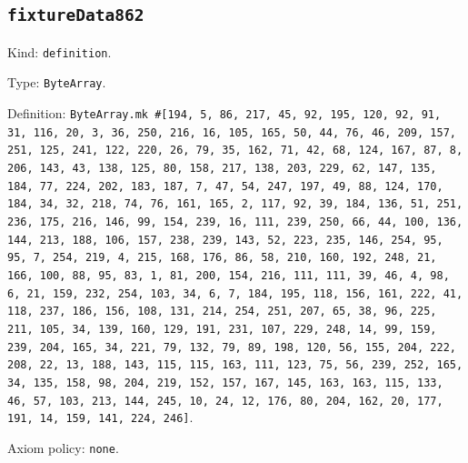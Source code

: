 \documentclass[11pt]{article}
\begin{document}
\subsection*{\texttt{fixtureData862}}
\noindent Kind: \texttt{definition}.\par
\noindent Type: \texttt{ByteArray}.\par
\noindent Definition: \texttt{ByteArray.mk \#[194, 5, 86, 217, 45, 92, 195, 120, 92, 91, 31, 116, 20, 3, 36, 250, 216, 16, 105, 165, 50, 44, 76, 46, 209, 157, 251, 125, 241, 122, 220, 26, 79, 35, 162, 71, 42, 68, 124, 167, 87, 8, 206, 143, 43, 138, 125, 80, 158, 217, 138, 203, 229, 62, 147, 135, 184, 77, 224, 202, 183, 187, 7, 47, 54, 247, 197, 49, 88, 124, 170, 184, 34, 32, 218, 74, 76, 161, 165, 2, 117, 92, 39, 184, 136, 51, 251, 236, 175, 216, 146, 99, 154, 239, 16, 111, 239, 250, 66, 44, 100, 136, 144, 213, 188, 106, 157, 238, 239, 143, 52, 223, 235, 146, 254, 95, 95, 7, 254, 219, 4, 215, 168, 176, 86, 58, 210, 160, 192, 248, 21, 166, 100, 88, 95, 83, 1, 81, 200, 154, 216, 111, 111, 39, 46, 4, 98, 6, 21, 159, 232, 254, 103, 34, 6, 7, 184, 195, 118, 156, 161, 222, 41, 118, 237, 186, 156, 108, 131, 214, 254, 251, 207, 65, 38, 96, 225, 211, 105, 34, 139, 160, 129, 191, 231, 107, 229, 248, 14, 99, 159, 239, 204, 165, 34, 221, 79, 132, 79, 89, 198, 120, 56, 155, 204, 222, 208, 22, 13, 188, 143, 115, 115, 163, 111, 123, 75, 56, 239, 252, 165, 34, 135, 158, 98, 204, 219, 152, 157, 167, 145, 163, 163, 115, 133, 46, 57, 103, 213, 144, 245, 10, 24, 12, 176, 80, 204, 162, 20, 177, 191, 14, 159, 141, 224, 246]}.\par
\noindent Axiom policy: \texttt{none}.\par
\end{document}
